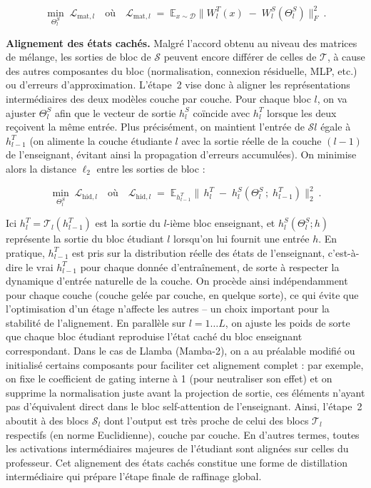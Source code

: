 \begin{equation}
\min_{\Theta^S_l} \; \mathcal{L}_{\text{mat},l} \quad \text{où} \quad \mathcal{L}_{\text{mat},l} \;=\; \mathbb{E}_{x \sim \mathcal{D}} \big\| W^T_l(x)\;-\;W^S_l(\Theta^S_l)\big\|_F^2~.
\end{equation}

\textbf{Alignement des états cachés.} Malgré l’accord obtenu au niveau des matrices de mélange, les sorties de bloc de $\mathcal{S}$ peuvent encore différer de celles de $\mathcal{T}$, à cause des autres composantes du bloc (normalisation, connexion résiduelle, MLP, etc.) ou d’erreurs d’approximation. L’étape 2 vise donc à aligner les représentations intermédiaires des deux modèles couche par couche. Pour chaque bloc $l$, on va ajuster $\Theta^S_l$ afin que le vecteur de sortie $h^S_l$ coïncide avec $h^T_l$ lorsque les deux reçoivent la même entrée. Plus précisément, on maintient l’entrée de $\mathcal{S}l$ égale à $h^T_{l-1}$ (on alimente la couche étudiante $l$ avec la sortie réelle de la couche $(l-1)$ de l'enseignant, évitant ainsi la propagation d’erreurs accumulées). On minimise alors la distance $\ell_2$ entre les sorties de bloc :

\begin{equation}
\min_{\Theta^S_l} \; \mathcal{L}_{\text{hid},l} \quad \text{où} \quad \mathcal{L}_{\text{hid},l} \;=\; \mathbb{E}_{h^T_{l-1}} \big\|\, h^T_l \;-\; h^S_l(\Theta^S_l\,;\; h^T_{l-1})\big\|_2^2~.
\end{equation}

Ici $h^T_l = \mathcal{T}_l(h^T_{l-1})$ est la sortie du $l$-ième bloc enseignant, et $h^S_l(\Theta^S_l; h)$ représente la sortie du bloc étudiant $l$ lorsqu’on lui fournit une entrée $h$. En pratique, $h^T_{l-1}$ est pris sur la distribution réelle des états de l'enseignant, c'est-à-dire le vrai $h^T_{l-1}$ pour chaque donnée d’entraînement, de sorte à respecter la dynamique d’entrée naturelle de la couche. On procède ainsi indépendamment pour chaque couche (couche gelée par couche, en quelque sorte), ce qui évite que l’optimisation d’un étage n’affecte les autres – un choix important pour la stabilité de l’alignement. En parallèle sur $l=1\dots L$, on ajuste les poids de sorte que chaque bloc étudiant reproduise l’état caché du bloc enseignant correspondant. Dans le cas de Llamba (Mamba-2), on a au préalable modifié ou initialisé certains composants pour faciliter cet alignement complet : par exemple, on fixe le coefficient de gating interne à 1 (pour neutraliser son effet) et on supprime la normalisation juste avant la projection de sortie, ces éléments n’ayant pas d’équivalent direct dans le bloc self-attention de l'enseignant. Ainsi, l’étape 2 aboutit à des blocs $\mathcal{S}_l$ dont l’output est très proche de celui des blocs $\mathcal{T}_l$ respectifs (en norme Euclidienne), couche par couche. En d’autres termes, toutes les activations intermédiaires majeures de l’étudiant sont alignées sur celles du professeur. Cet alignement des états cachés constitue une forme de distillation intermédiaire qui prépare l’étape finale de raffinage global.\\

